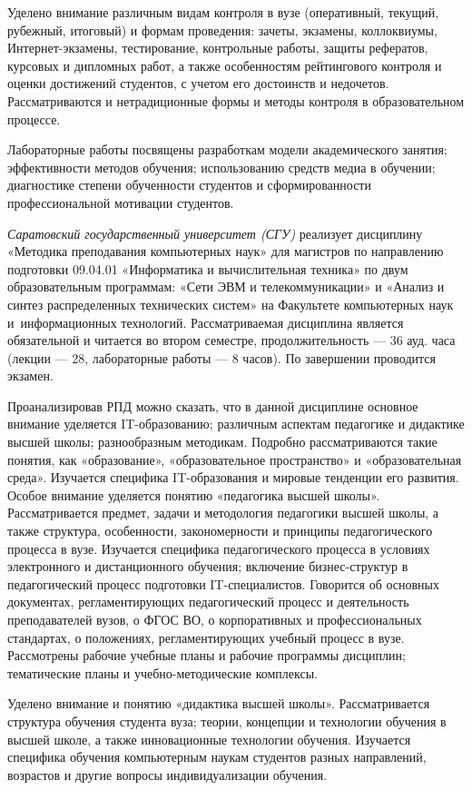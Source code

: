 \documentclass{math-mech-sci}
\begin{document}
Уделено внимание различным видам контроля в вузе (оперативный, текущий, рубежный, итоговый) и формам проведения: зачеты, экзамены, коллоквиумы, Интернет-экзамены, тестирование, контрольные работы, защиты рефератов, курсовых и дипломных работ, а также особенностям рейтингового контроля и оценки достижений студентов, с учетом его достоинств и недочетов. Рассматриваются и нетрадиционные формы и методы контроля в образовательном процессе.

Лабораторные работы посвящены разработкам модели академического занятия; эффективности методов обучения; использованию средств медиа в обучении; диагностике степени обученности студентов и сформированности профессиональной мотивации студентов.


{\it Саратовский государственный университет (СГУ)} реализует дисциплину «Методика преподавания компьютерных наук» для магистров по направлению подготовки 09.04.01 «Информатика и вычислительная техника» по двум образовательным программам: «Сети ЭВМ и телекоммуникации» и «Анализ и синтез распределенных технических систем» на Факультете компьютерных наук и информационных технологий.
Рассматриваемая дисциплина является обязательной и читается во втором семестре, продолжительность –-- 36 ауд. часа (лекции --– 28, лабораторные работы –-- 8 часов). По завершении проводится экзамен.

Проанализировав РПД можно сказать, что в данной дисциплине основное внимание уделяется IT-образованию; различным аспектам педагогике и дидактике высшей школы; разнообразным методикам.
Подробно рассматриваются такие понятия, как «образование», «образовательное пространство» и «образовательная среда». Изучается специфика IT-образования и мировые тенденции его развития. 
Особое внимание уделяется понятию «педагогика высшей школы». Рассматривается предмет, задачи и методология педагогики высшей школы, а также структура, особенности, закономерности и принципы педагогического процесса в вузе. Изучается специфика педагогического процесса в условиях электронного и дистанционного обучения; включение бизнес-структур в педагогический процесс подготовки IT-специалистов. 
Говорится об основных документах, регламентирующих педагогический процесс и деятельность преподавателей вузов, о ФГОС ВО, о корпоративных и профессиональных стандартах, о положениях, регламентирующих учебный процесс в вузе. Рассмотрены рабочие учебные планы и рабочие программы дисциплин; тематические планы и учебно-методические комплексы.

Уделено внимание и понятию «дидактика высшей школы». Рассматривается структура обучения студента вуза; теории, концепции и технологии обучения в высшей школе, а также инновационные технологии обучения. Изучается специфика обучения компьютерным наукам студентов разных направлений, возрастов и другие вопросы индивидуализации обучения. 
\end{document}
